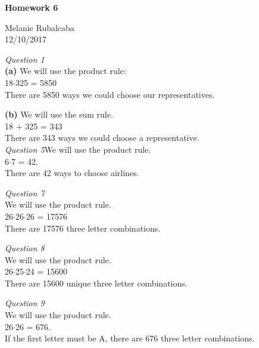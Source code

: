 \documentclass[12pt]{article}
\begin{document}
\center\textbf{Homework 6}\\

\begin{flushleft}
Melanie Rubalcaba\\
12/10/2017

\vspace{0.25cm}

\emph{Question 1}\\
\textbf{(a)}  We will use the product rule:\\
18\(\cdot\)325 = 5850\\
There are 5850 ways we could choose our representatives.\\

\vspace{0.25cm}

\textbf{(b)}  We will  use the sum rule.\\
18 + 325 = 343\\
There are 343 ways we could choose a representative.\\

\vspace{0.25cm}
\emph{Question 5}We will use the product rule.\\
6\(\cdot\)7 = 42.\\
There are 42 ways to choose airlines.\\

\vspace{0.25cm}

\emph{Question 7}\\

We will use the product rule.\\
26\(\cdot\)26\(\cdot\)26 = 17576\\
There are 17576 three letter combinations.\\

\vspace{0.25cm}

\emph{Question 8}\\

We will use the product rule.\\
26\(\cdot\)25\(\cdot\)24 = 15600\\
There are 15600 unique three letter combinations.\\

\vspace{0.25cm}

\emph{Question 9}\\
We will use the product rule.\\
26\(\cdot\)26 = 676.\\
If the first letter must be A, there are 676 three letter combinations.\\


\end{flushleft}
\end{document}

